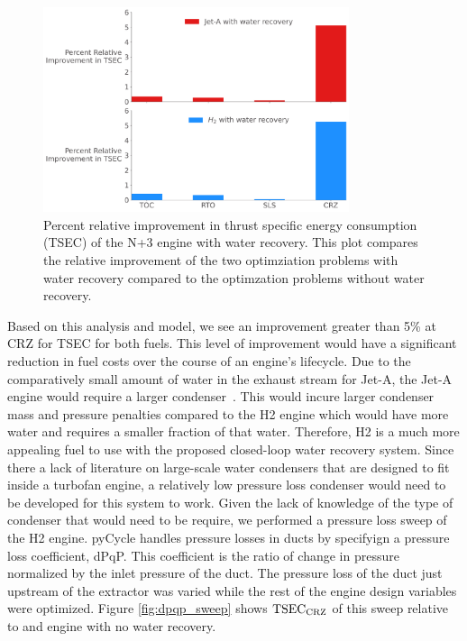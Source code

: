 \documentclass[conf]{new-aiaa}
\begin{document}
\begin{figure}[hbt!]
    \centering
    \includegraphics[width=0.8\textwidth]{JetA-H2_TSEC_diff.pdf}
    \caption{Percent relative improvement in thrust specific energy consumption (TSEC) of the N+3 engine with water recovery.
        This plot compares the relative improvement of the two optimziation problems with water recovery compared to the optimzation problems without water recovery.}
    \label{fig:barchart}
\end{figure}

Based on this analysis and model, we see an improvement greater than 5\% at CRZ for TSEC for both fuels.
This level of improvement would have a significant reduction in fuel costs over the course of an engine's lifecycle.
Due to the comparatively small amount of water in the exhaust stream for Jet-A, the Jet-A engine would require a larger condenser~\cite{Strom2002}.
This would incure larger condenser mass and pressure penalties compared to the H2 engine which would have more water and requires a smaller fraction of that water.
Therefore, H2 is a much more appealing fuel to use with the proposed closed-loop water recovery system.
Since there a lack of literature on large-scale water condensers that are designed to fit inside a turbofan engine, a relatively low pressure loss condenser would need to be developed for this system to work.
Given the lack of knowledge of the type of condenser that would need to be require, we performed a pressure loss sweep of the H2 engine.
pyCycle handles pressure losses in ducts by specifyign a pressure loss coefficient, dPqP.
This coefficient is the ratio of change in pressure normalized by the inlet pressure of the duct.
The pressure loss of the duct just upstream of the extractor was varied while the rest of the engine design variables were optimized.
Figure \ref{fig:dpqp_sweep} shows $\rm{TSEC}_{\rm{CRZ}}$ of this sweep relative to and engine with no water recovery.
\end{document}

